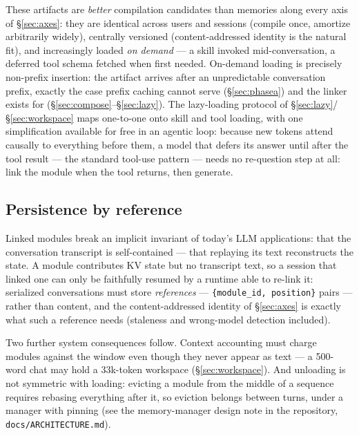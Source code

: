 \documentclass[11pt]{article}
\newcommand{\code}[1]{\texttt{#1}}
\begin{document}
These artifacts are \emph{better} compilation candidates than memories along every axis of \S\ref{sec:axes}: they are identical across users and sessions (compile once, amortize arbitrarily widely), centrally versioned (content-addressed identity is the natural fit), and increasingly loaded \emph{on demand} --- a skill invoked mid-conversation, a deferred tool schema fetched when first needed. On-demand loading is precisely non-prefix insertion: the artifact arrives after an unpredictable conversation prefix, exactly the case prefix caching cannot serve (\S\ref{sec:phasea}) and the linker exists for (\S\ref{sec:compose}--\S\ref{sec:lazy}). The lazy-loading protocol of \S\ref{sec:lazy}/\S\ref{sec:workspace} maps one-to-one onto skill and tool loading, with one simplification available for free in an agentic loop: because new tokens attend causally to everything before them, a model that defers its answer until after the tool result --- the standard tool-use pattern --- needs no re-question step at all: link the module when the tool returns, then generate.

\subsection{Persistence by reference}
\label{sec:byref}

Linked modules break an implicit invariant of today's LLM applications: that the conversation transcript is self-contained --- that replaying its text reconstructs the state. A module contributes KV state but no transcript text, so a session that linked one can only be faithfully resumed by a runtime able to re-link it: serialized conversations must store \emph{references} --- \code{\{module\_id, position\}} pairs --- rather than content, and the content-addressed identity of \S\ref{sec:axes} is exactly what such a reference needs (staleness and wrong-model detection included).

Two further system consequences follow. Context accounting must charge modules against the window even though they never appear as text --- a 500-word chat may hold a 33k-token workspace (\S\ref{sec:workspace}). And unloading is not symmetric with loading: evicting a module from the middle of a sequence requires rebasing everything after it, so eviction belongs between turns, under a manager with pinning (see the memory-manager design note in the repository, \code{docs/ARCHITECTURE.md}).
\end{document}
